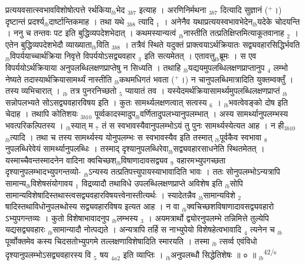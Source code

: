 \documentclass[article,12pt,a4paper]{memoir}%
\newcommand{\add}[1]{($^{+}$#1)}
\newcounter{parCount}
\begin{document}
प्रत्ययवसात्स्वभावविशोषोत्पत्ते {\color{DodgerBlue3}रर्थकिया{\tiny $_{lb}$}भेद} {\tiny $_{3b7}$} इत्याह । {\color{DodgerBlue3}अरणिनिर्मथना} {\tiny $_{3b7}$} दित्यादि सुज्ञानं \add{।} दृष्टान्तं प्रदर्श्य{\tiny $_{lb}$}दार्ष्टान्तिकमाह । {\color{DodgerBlue3}तथा यथे} {\tiny $_{3b8}$} त्यादि {\tiny $_{1}$} । अनेनैव यथाप्रत्ययस्वभावभेदेन{\tiny $_{lb}$}यदेके चोदयन्ति । ननु च तन्तवः पट इति बुद्धिव्यपदेशभेदात् । कथमस्यान्यत्वं {\tiny $_{lb}$}नास्तीति तत्प्रतिक्षिप्तमित्याकूतवानाह {\tiny $_{2}$} । {\color{DodgerBlue3}एतेन बुद्धिव्यपदेशभेदौ व्याख्याता{\tiny $_{lb}$}विति} {\tiny $_{3b8}$} । तत्रैवं स्थिते यदुक्तं प्राक्त्वयाऽर्थक्रियातः सद्व्यवहारसिद्धिर्भवति {\tiny $_{lb}$}विपर्ययाच्चार्थक्रिया निवृत्ते विपर्ययोऽसद्व्यवहार {\tiny $_{3}$} इति सत्यमेतत् । एतावत्तु{\tiny $_{lb}$}ब्रूमः । स एव विपर्ययोऽर्थक्रियाया अनुपलब्धिलक्षणप्राप्तेषु न सिध्यति । तथाहि {\tiny $_{lb}$}यद्ययमुपलब्धिलक्षणप्राप्तानुप {\tiny $_{4}$} लम्भो नेष्यते तदास्यार्थक्रियासामर्थ्यं नास्तीति {\tiny $_{lb}$}कथमधिगतं भवता \add{।} न चानुपलब्धिमात्रादिति युक्तम्वक्तुँ । तस्य व्यभिचारात् । {\tiny $_{lb}$} \leavevmode{} तत्र पुनरनिच्छतो {\tiny $_{5}$} प्यायातं तव । यस्येदमर्थक्रियासामर्थ्यमुपलब्धिलक्षणप्राप्तं {\tiny $_{lb}$}सन्नोपलभ्यते सोऽसद्व्यवहारविषय इति । कुतः सामर्थ्यलक्षणत्वात् सत्वस्य {\tiny $_{6}$} । {\tiny $_{lb}$}भवत्वेवङ्को दोष इति चेदाह । {\color{DodgerBlue3}तथापि कोतिशयः} {\tiny $_{3b10}$} पूर्व्वकादस्मादुप{\tiny $_{lb}$}वर्णितादुपलभ्यानुपलम्भात् । अस्य सामर्थ्यानुपलम्भस्य भवत्परिकल्पितस्य । {\tiny $_{lb}$}स्यात् म {\tiny $_{7}$} तं स स्वभावस्यैवानुपलम्भोऽयं तु पुनः सामर्थ्यस्येत्यत आह । {\color{DodgerBlue3}न ही}{\tiny $_{3b10}$} {\tiny $_{lb}$}त्यादि । तथा च तस्य सामर्थ्यस्य योनुपलम्भः स स्वभावस्यैव इति तस्मात् {\tiny $_{lb}$}पूर्वकैव स्वभावा {\tiny $_{8}$} नुपलब्धिरेवेयं सामर्थ्यानुपलब्धिः । तस्माद् दृश्यानुपलब्धिरेवा{\tiny $_{lb}$}सद्व्यवहारसाधनेति स्थितमेतत् । यस्माच्चैवन्तस्मादनेन वादिना क्वचिच्छश{\tiny $_{lb}$}विषाणादावसद्व्यव {\tiny $_{9}$} \leavevmode{} वहारमभ्युपगच्छता दृश्यानुपलम्भादभ्युपगन्तव्यो- {\tiny $_{lb}$}ऽन्यस्य तत्प्रतिपत्त्युपायस्याभावादिति भावः । ततः सोनुपलम्भोऽन्यत्रापि सामान्य{\tiny $_{lb}$}विशेषसंयोगावय {\tiny $_{1}$} विद्रव्यादौ तथाविधे उपलब्धिलक्षणप्राप्ते अविशेष इति {\tiny $_{lb}$}सोपि सामान्यविशेषादिस्तथास्त्वसद्व्यवहारविषयत्त्वेनास्तीत्यर्थः । स्यादेतन्नैव {\tiny $_{lb}$}सामान्यविशे {\tiny $_{2}$} षादिस्तथाविधोनुपलब्धोस्य सद्व्यवहारविषय इत्यत आह । न वा {\tiny $_{lb}$}क्वचिच्छशविषाणादावसद्व्यवहारो ऽभ्युपगन्तव्यः । कुतो विशेषाभावादनुप {\tiny $_{lb}$}लम्भस्य {\tiny $_{3}$} । अयमत्रार्थो द्व्योरनुपलम्भे तन्निमित्ते तुल्येपि यद्यसद्व्यवहारः {\tiny $_{lb}$}सामान्यादौ नोत्पद्यते । अन्यत्रापि तर्हि स नाभ्युपेयो विशेषहेत्वभावादि {\tiny $_{4}$} त्यनेन च {\tiny $_{lb}$}पूर्व्वोक्तमेव कस्य चिदसतोभ्युपगमे तल्लक्षणाविशेषादिति स्मारयति । तस्मा {\tiny $_{lb}$} {\color{DodgerBlue3}त्सर्व्व एवंविधो दृश्यानुपलम्भोऽसद्व्यवहारस्य वि {\tiny $_{5}$} षय} {\tiny $_{4a2}$} इति व्याप्तिः । {\tiny $_{lb}$}अनुपलब्धौ सिद्धेतिशेषः ॥ ० ॥
	{}
	\pend%
      {\tiny $_{lb}$}\textsuperscript{\textenglish{42/s}}
\end{document}
